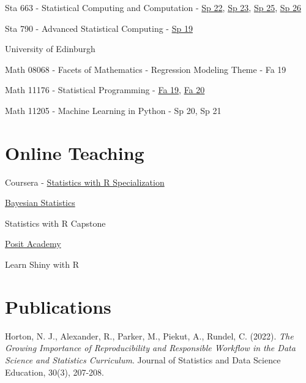 \documentclass[margin,line]{res}
\begin{document}
\begin{resume}
\begin{list1}
\item[] Sta 663 - Statistical Computing and Computation - \href{https://sta663-sp22.github.io/}{Sp 22}, \href{https://sta663-sp23.github.io/}{Sp 23}, \href{https://sta663-sp25.github.io/}{Sp 25}, \href{https://sta663-sp26.github.io/}{Sp 26}

\item[] Sta 790 - Advanced Statistical Computing - \href{http://stat.duke.edu/~cr173/Sta790_Sp19/}{Sp 19}
\end{list1}

\pagebreak

University of Edinburgh

\begin{list1}
\item[] Math 08068 - Facets of Mathematics - Regression Modeling Theme - Fa 19 

\item[] Math 11176 - Statistical Programming - \href{https://statprog-s1-2019.github.io/}{Fa 19}, \href{https://statprog-s1-2020.github.io/}{Fa 20}

\item[] Math 11205 - Machine Learning in Python - Sp 20, Sp 21
\end{list1}


\section{\sc Online Teaching}

Coursera - \href{https://www.coursera.org/specializations/statistics}{Statistics with R Specialization}
\begin{list1}
\item[] \href{https://www.coursera.org/learn/bayesian}{Bayesian Statistics}
\item[] Statistics with R Capstone
\end{list1}

\href{https://posit.co/products/enterprise/academy/}{Posit Academy}

\begin{list1}
\item[] Learn Shiny with R
\end{list1}

\section{\sc Publications}

Horton, N. J., Alexander, R., Parker, M., Piekut, A., Rundel, C. (2022). {\em The Growing Importance of Reproducibility and Responsible Workflow in the Data Science and Statistics Curriculum}. Journal of Statistics and Data Science Education, 30(3), 207-208.


\end{resume}
\end{document}
